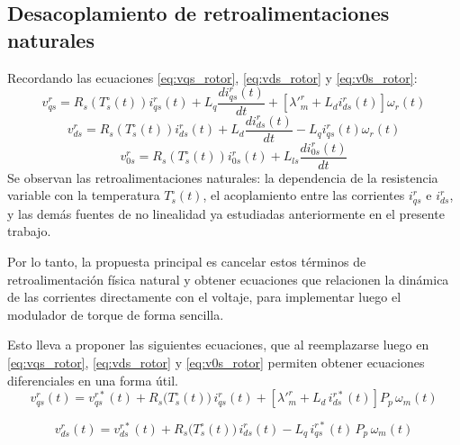\documentclass[12pt, a4paper,journal, onecolumn, compsoc]{IEEEtran}
\begin{document}
\subsection{Desacoplamiento de retroalimentaciones naturales}
Recordando las ecuaciones \eqref{eq:vqs_rotor}, \eqref{eq:vds_rotor} y \eqref{eq:v0s_rotor}:
    \begin{equation*}
        v^r_{qs}=R_s(T_s^\circ(t))i^r_{qs}(t) + L_q\frac{d i^r_{qs}(t)}{dt}+[\lambda'^r_m + L_d i^r_{ds}(t)]\omega_r(t)
    \end{equation*}
    \begin{equation*}
        v_{ds}^r=R_s(T_s^\circ(t))i^r_{ds}(t)+L_d\frac{d i^r_{ds}(t)}{dt} - L_qi^r_{qs}(t)\omega_r(t)
    \end{equation*}
    \begin{equation*}
        v^r_{0s}=R_s(T_s^\circ(t))i^r_{0s}(t)+L_{ls}\frac{d i^r_{0s}(t)}{dt}
    \end{equation*}
Se observan las retroalimentaciones naturales: la dependencia de la resistencia variable con la temperatura $T_s^\circ(t)$, el acoplamiento entre las corrientes $i_{qs}^r$ e $i_{ds}^r$, y las demás fuentes de no linealidad ya estudiadas anteriormente en el presente trabajo.

Por lo tanto, la propuesta principal es cancelar estos términos de retroalimentación física natural y obtener ecuaciones que relacionen la dinámica de las corrientes directamente con el voltaje, para implementar luego el modulador de torque de forma sencilla.

Esto lleva a proponer las siguientes ecuaciones, que al reemplazarse luego en \eqref{eq:vqs_rotor}, \eqref{eq:vds_rotor} y \eqref{eq:v0s_rotor} permiten obtener ecuaciones diferenciales en una forma útil.
\begin{equation}
v_{qs}^{r}(t) = v_{qs}^{r*}(t) 
+ R_s\!\big(T_s^{\circ}(t)\big)\, i_{qs}^{r}(t) 
+ \left[\lambda'^r_m + L_d\, i_{ds}^{r*}(t)\right] P_p\, \omega_m(t)
\label{eq:vqs_r}
\end{equation}

\begin{equation}
v_{ds}^{r}(t) = v_{ds}^{r*}(t) 
+ R_s\!\big(T_s^{\circ}(t)\big)\, i_{ds}^{r}(t) 
- L_q\, i_{qs}^{r*}(t)\, P_p\, \omega_m(t)
\label{eq:vds_r}
\end{equation}
\end{document}
